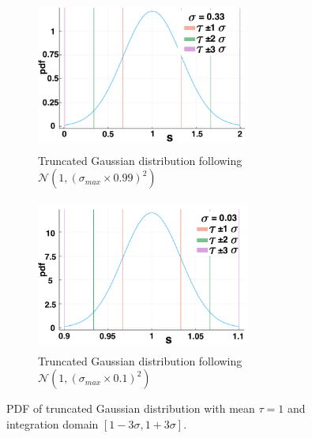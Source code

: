 \begin{figure}[H]
    \centering
    \begin{subfigure}[b]{0.45\textwidth}
        \centering
        \includegraphics[width=7cm,height=5cm]{t1sig1.png}
        \caption{Truncated Gaussian distribution following $\mathcal{N}(1,(\sigma_{max}\times0.99)^2)$}
        \label{}
    \end{subfigure}
    \hfill
    \begin{subfigure}[b]{0.45\textwidth}
        \centering
        \includegraphics[width=7cm,height=5cm]{t1sig2.png}
        \caption{Truncated Gaussian distribution following $\mathcal{N}(1,(\sigma_{max}\times0.1)^2)$}
        \label{}
    \end{subfigure}
\caption{PDF of truncated Gaussian distribution with mean $\tau=1$ and integration domain $[1-3\sigma,1+3\sigma]$.}
\label{fig:pdf1}
\end{figure}
